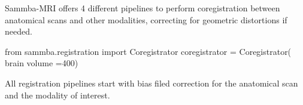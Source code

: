 \documentclass[utf8, a4paper, final, crop]{frontiersSCNS} %
\begin{document}

Sammba-MRI offers 4 different pipelines to perform coregistration
between anatomical scans and other modalities, correcting for geometric 
distortions if needed.
\begin{python}
from sammba.registration import 
    Coregistrator
coregistrator = Coregistrator(
    brain volume =400)
\end{python}
All registration pipelines start with bias filed correction for the anatomical scan
and the modality of interest. 
\end{document}
